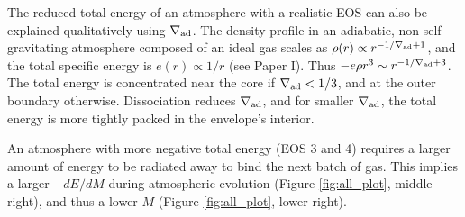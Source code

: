 The reduced total energy of an atmosphere with a realistic EOS can also be explained qualitatively using $\nabla_{\rm ad}$.  The density profile in an adiabatic, non-self-gravitating atmosphere composed of an ideal gas scales as $\rho(r) \propto r^{-1/\nabla_{\rm ad}+1}$, and the total specific energy is $e(r) \propto 1/r$ (see Paper I). Thus $- e \rho r^3 \sim r^{-1/\nabla_{\rm ad}+3}$.
 The total energy is concentrated near the core if $\nabla_{\rm ad}<1/3$, and at the outer boundary otherwise. 
Dissociation reduces $\nabla_{\rm ad}$, and for smaller $\nabla_{\rm ad}$, the total energy is more tightly packed in the envelope's interior.


An atmosphere with more negative total energy (EOS 3 and 4) requires a larger amount of energy to be radiated away to bind the next batch of gas. This implies a larger $-dE/dM$ during atmospheric evolution (Figure \ref{fig:all_plot}, middle-right), and thus a lower $\dot{M}$ (Figure \ref{fig:all_plot}, lower-right). 





